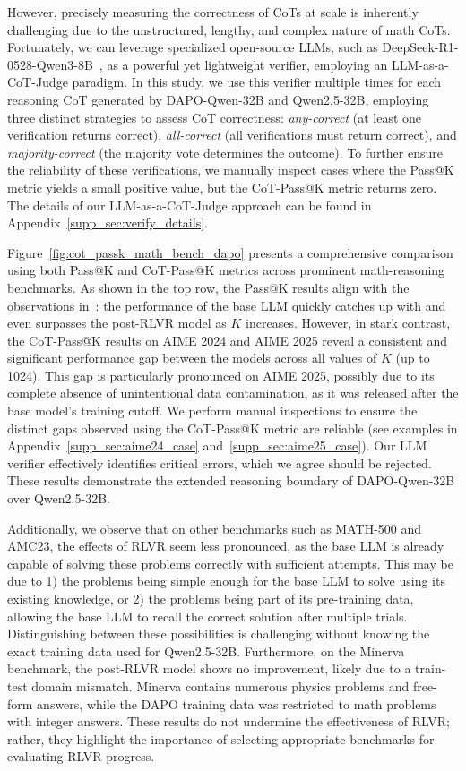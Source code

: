 However, precisely measuring the correctness of CoTs at scale is inherently challenging due to the unstructured, lengthy, and complex nature of math CoTs. Fortunately, we can leverage specialized open-source LLMs, such as DeepSeek-R1-0528-Qwen3-8B~\citep{deepseek2025R1-0528}, as a powerful yet lightweight verifier, employing an LLM-as-a-CoT-Judge paradigm. In this study, we use this verifier multiple times for each reasoning CoT generated by DAPO-Qwen-32B and Qwen2.5-32B, employing three distinct strategies to assess CoT correctness: \emph{any-correct} (at least one verification returns correct), \emph{all-correct} (all verifications must return correct), and \emph{majority-correct} (the majority vote determines the outcome). To further ensure the reliability of these verifications, we manually inspect cases where the Pass@K metric yields a small positive value, but the CoT-Pass@K metric returns zero.
The details of our LLM-as-a-CoT-Judge approach can be found in Appendix~\ref{supp_sec:verify_details}.

Figure~\ref{fig:cot_passk_math_bench_dapo} presents a comprehensive comparison using both Pass@K and CoT-Pass@K metrics across prominent math-reasoning benchmarks. As shown in the top row, the Pass@K results align with the observations in~\citep{yue2025RLVR_limit}: the performance of the base LLM quickly catches up with and even surpasses the post-RLVR model as $K$ increases. However, in stark contrast, the CoT-Pass@K results on AIME 2024 and AIME 2025 reveal a consistent and significant performance gap between the models across all values of $K$ (up to 1024). This gap is particularly pronounced on AIME 2025, possibly due to its complete absence of unintentional data contamination, as it was released after the base model’s training cutoff. We perform manual inspections to ensure the distinct gaps observed using the CoT-Pass@K metric are reliable (see examples in Appendix~\ref{supp_sec:aime24_case} and~\ref{supp_sec:aime25_case}). Our LLM verifier effectively identifies critical errors, which we agree should be rejected. These results demonstrate the extended reasoning boundary of DAPO-Qwen-32B over Qwen2.5-32B.

Additionally, we observe that on other benchmarks such as MATH-500 and AMC23, the effects of RLVR seem less pronounced, as the base LLM is already capable of solving these problems correctly with sufficient attempts. This may be due to 1) the problems being simple enough for the base LLM to solve using its existing knowledge, or 2) the problems being part of its pre-training data, allowing the base LLM to recall the correct solution after multiple trials. Distinguishing between these possibilities is challenging without knowing the exact training data used for Qwen2.5-32B. Furthermore, on the Minerva benchmark, the post-RLVR model shows no improvement, likely due to a train-test domain mismatch. Minerva contains numerous physics problems and free-form answers, while the DAPO training data was restricted to math problems with integer answers. These results do not undermine the effectiveness of RLVR; rather, they highlight the importance of selecting appropriate benchmarks for evaluating RLVR progress.

